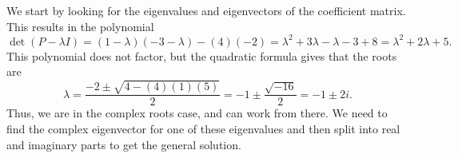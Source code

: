 \begin{exampleSol}
We start by looking for the eigenvalues and eigenvectors of the coefficient matrix. This results in the polynomial
\begin{equation*}
\det(P - \lambda I) = (1-\lambda)(-3-\lambda) - (4)(-2) = \lambda^2 + 3\lambda - \lambda  - 3 + 8 = \lambda^2 + 2\lambda + 5.
\end{equation*}
This polynomial does not factor, but the quadratic formula gives that the roots are
\begin{equation*}
\lambda = \frac{-2 \pm \sqrt{4 - (4)(1)(5)}}{2} = -1 \pm \frac{\sqrt{-16}}{2} = -1 \pm 2i.
\end{equation*}
Thus, we are in the complex roots case, and can work from there. We need to find the complex eigenvector for one of these eigenvalues and then split into real and imaginary parts to get the general solution. 


\end{exampleSol}
